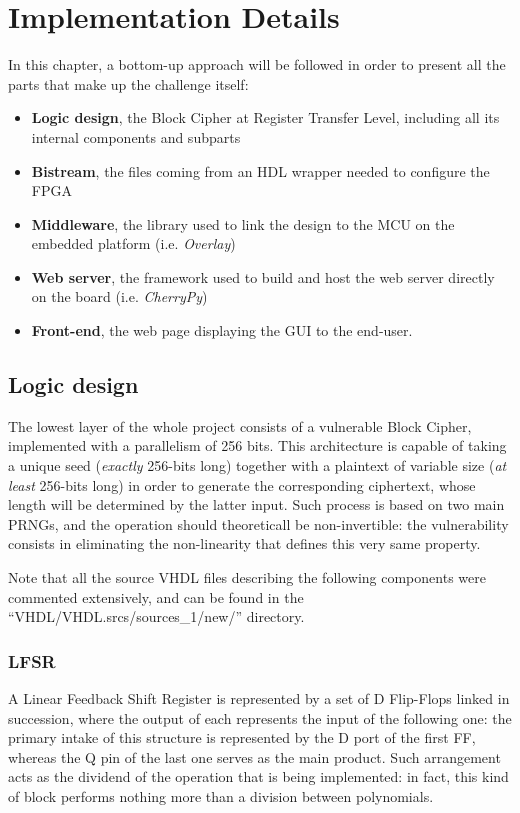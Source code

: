 \chapter{Implementation Details}
\label{Chapter4}
In this chapter, a bottom-up approach will be followed in order to present all the parts that make up the challenge itself:
\begin{itemize}
\item \textbf{Logic design}, the Block Cipher at Register Transfer Level, including all its internal components and subparts
\item \textbf{Bistream}, the files coming from an HDL wrapper needed to configure the FPGA
\item \textbf{Middleware}, the library used to link the design to the MCU on the embedded platform (i.e. \emph{Overlay})
\item \textbf{Web server}, the framework used to build and host the web server directly on the board (i.e. \emph{CherryPy})
\item \textbf{Front-end}, the web page displaying the GUI to the end-user.
\end{itemize}
\section{Logic design}
The lowest layer of the whole project consists of a vulnerable Block Cipher, implemented with a parallelism of 256 bits.
This architecture is capable of taking a unique seed (\emph{exactly} 256-bits long) together with a plaintext of variable size (\emph{at least} 256-bits long) in order to generate the corresponding ciphertext, whose length will be determined by the latter input.
Such process is based on two main PRNGs, and the operation should theoreticall be non-invertible: the vulnerability consists in eliminating the non-linearity that defines this very same property.

Note that all the source VHDL files describing the following components were commented extensively, and can be found in the ``VHDL/VHDL.srcs/sources\_1/new/'' directory.
\subsection{LFSR}
A Linear Feedback Shift Register is represented by a set of D Flip-Flops linked in succession, where the output of each represents the input of the following one: the primary intake of this structure is represented by the D port of the first FF, whereas the Q pin of the last one serves as the main product.
Such arrangement acts as the dividend of the operation that is being implemented: in fact, this kind of block performs nothing more than a division between polynomials.

